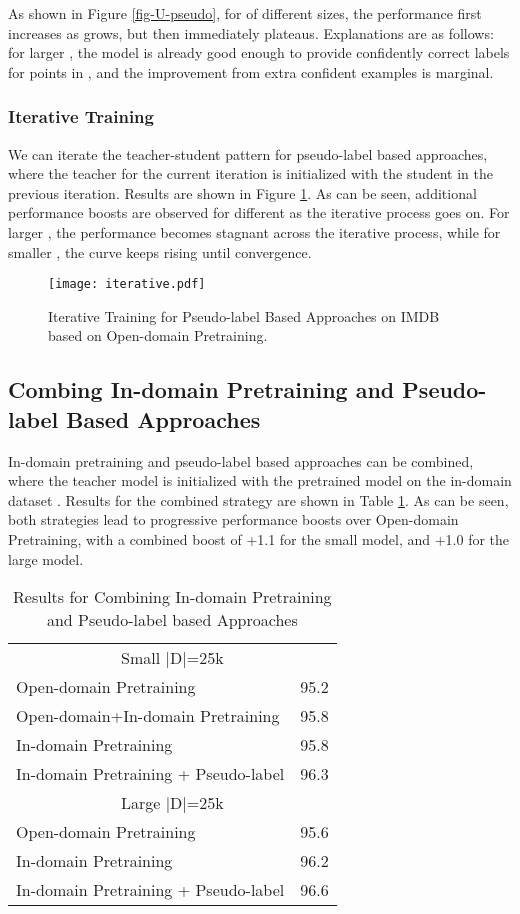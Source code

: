 \documentclass[11pt,a4paper]{article}
\begin{document}
 As shown in Figure \ref{fig-U-pseudo},
for  of different sizes,
the performance first increases as  grows, but then immediately  plateaus. 
Explanations are as follows: 
for larger , the model is already good enough to provide confidently correct labels for points in , and the improvement from 
extra confident  examples is marginal. 

\subsubsection{Iterative Training}
We can iterate the teacher-student pattern 
for pseudo-label based approaches, where the teacher for the current iteration is initialized with the student in the previous iteration.
Results are shown in Figure \ref{Iterative}. As can be seen, additional performance boosts are observed for different  as the iterative process goes on.
For larger , the performance becomes stagnant across the iterative process, while for smaller , the curve keeps rising until convergence.  

\begin{figure}[t]
\center
    \texttt{[image: iterative.pdf]}
  \caption{Iterative Training for Pseudo-label Based Approaches on IMDB based on Open-domain Pretraining.}
  \label{Iterative}
\end{figure}

\subsection{Combing In-domain Pretraining and Pseudo-label Based Approaches}
In-domain pretraining and pseudo-label based approaches can be combined, where the teacher model is initialized with the pretrained model on the in-domain dataset . 
Results
for the combined strategy 
 are shown in Table \ref{combined}.
As can be seen, both strategies lead to progressive performance boosts over Open-domain Pretraining, with a combined boost of +1.1 for the small model, and
+1.0 for the large model. 
 
\begin{table}
\center
\small
\begin{tabular}{ll}\hline
\multicolumn{2}{c}{Small |D|=25k}   \\
Open-domain Pretraining & 95.2 \\
Open-domain+In-domain Pretraining & 95.8 \\
In-domain Pretraining &95.8 \\
In-domain Pretraining + Pseudo-label & 96.3\\\hline
\multicolumn{2}{c}{Large |D|=25k}   \\
Open-domain Pretraining & 95.6 \\
In-domain Pretraining & 96.2 \\
In-domain Pretraining + Pseudo-label & 96.6\\\hline
\end{tabular}
\caption{Results for Combining In-domain Pretraining and Pseudo-label based Approaches}
\label{combined}
\end{table}
\end{document}
